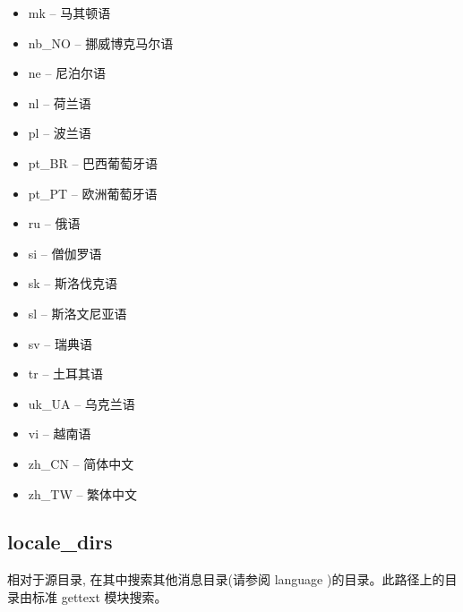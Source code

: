 \documentclass[a4paper,10pt,english]{sphinxmanual}
\begin{document}
\begin{itemize}
\item {} 
\sphinxAtStartPar
mk – 马其顿语

\item {} 
\sphinxAtStartPar
nb\_NO – 挪威博克马尔语

\item {} 
\sphinxAtStartPar
ne – 尼泊尔语

\item {} 
\sphinxAtStartPar
nl – 荷兰语

\item {} 
\sphinxAtStartPar
pl – 波兰语

\item {} 
\sphinxAtStartPar
pt\_BR – 巴西葡萄牙语

\item {} 
\sphinxAtStartPar
pt\_PT – 欧洲葡萄牙语

\item {} 
\sphinxAtStartPar
ru – 俄语

\item {} 
\sphinxAtStartPar
si – 僧伽罗语

\item {} 
\sphinxAtStartPar
sk – 斯洛伐克语

\item {} 
\sphinxAtStartPar
sl – 斯洛文尼亚语

\item {} 
\sphinxAtStartPar
sv – 瑞典语

\item {} 
\sphinxAtStartPar
tr – 土耳其语

\item {} 
\sphinxAtStartPar
uk\_UA – 乌克兰语

\item {} 
\sphinxAtStartPar
vi – 越南语

\item {} 
\sphinxAtStartPar
zh\_CN – 简体中文

\item {} 
\sphinxAtStartPar
zh\_TW – 繁体中文

\end{itemize}


\subsection{locale\_dirs}
\label{\detokenize{sphinx_conf:locale-dirs}}
\sphinxAtStartPar
相对于源目录, 在其中搜索其他消息目录(请参阅 language )的目录。此路径上的目录由标准 gettext 模块搜索。
\end{document}
